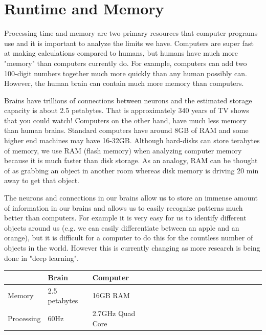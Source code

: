 \documentclass[11pt,oneside]{book}
\begin{document}
        \section{ Runtime and Memory }
        

Processing time and memory are two primary resources that computer programs use and it is important to analyze the limits we have. Computers are super fast at making calculations compared to humans, but humans have much more "memory" than computers currently do. For example, computers can add two 100-digit numbers together much more quickly than any human possibly can. However, the human brain can contain much more memory than computers.

Brains have trillions of connections between neurons and the estimated storage capacity is about 2.5 petabytes. That is approximately 340 years of TV shows that you could watch! Computers on the other hand, have much less memory than human brains. Standard computers have around 8GB of RAM and some higher end machines may have 16-32GB. Although hard-disks can store terabytes of memory, we use RAM (flash memory) when analyzing computer memory because it is much faster than disk storage. As an analogy, RAM can be thought of as grabbing an object in another room whereas disk memory is driving 20 min away to get that object.

The neurons and connections in our brains allow us to store an immense amount of information in our brains and allows us to easily recognize patterns much better than computers. For example it is very easy for us to identify different objects around us (e.g. we can easily differentiate between an apple and an orange), but it is difficult for a computer to do this for the countless number of objects in the world. However this is currently changing as more research is being done in "deep learning".

\vspace{10px}\begin{tabulary}{0.4\linewidth}{|l|l|l|l|l|l|l|l|l|l|l|l|l|l|l|l|l|l|l}\hline


   &
  Brain &
  Computer\\
\hline


  Memory &
  2.5 petabytes &
  16GB RAM\\

  Processing &
  60Hz &
  2.7GHz Quad Core\\

\hline\end{tabulary}
\end{document}
